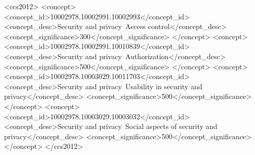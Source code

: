 \documentclass[sigconf]{acmart}
\theoremstyle{mydef}
\begin{document}
\begin{abstract}

\end{abstract}


\begin{CCSXML}
<ccs2012>
   <concept>
       <concept_id>10002978.10002991.10002993</concept_id>
       <concept_desc>Security and privacy~Access control</concept_desc>
       <concept_significance>300</concept_significance>
       </concept>
   <concept>
       <concept_id>10002978.10002991.10010839</concept_id>
       <concept_desc>Security and privacy~Authorization</concept_desc>
       <concept_significance>500</concept_significance>
       </concept>
   <concept>
       <concept_id>10002978.10003029.10011703</concept_id>
       <concept_desc>Security and privacy~Usability in security and privacy</concept_desc>
       <concept_significance>500</concept_significance>
       </concept>
   <concept>
       <concept_id>10002978.10003029.10003032</concept_id>
       <concept_desc>Security and privacy~Social aspects of security and privacy</concept_desc>
       <concept_significance>500</concept_significance>
       </concept>
 </ccs2012>
\end{CCSXML}



\maketitle

%
\end{document}
